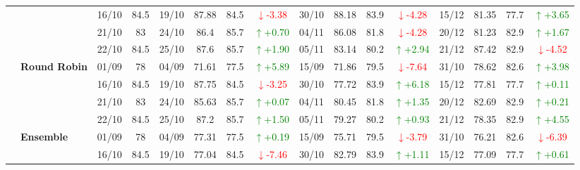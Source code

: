 {\begin{longtable}{llcc|cccc|cccc|cccc}
&
& 16/10 & 84.5 & 19/10 & 87.88 & 84.5 & \textcolor{red}{\(\downarrow\)-3.38} & 30/10 & 88.18 & 83.9 & \textcolor{red}{\(\downarrow\)-4.28} & 15/12 & 81.35 & 77.7 & \textcolor{green}{\(\uparrow\)+3.65} \\

&
& 21/10 & 83 & 24/10 & 86.4 & 85.7 & \textcolor{green}{\(\uparrow\)+0.70} & 04/11 & 86.08 & 81.8 & \textcolor{red}{\(\downarrow\)-4.28} & 20/12 & 81.23 & 82.9 & \textcolor{green}{\(\uparrow\)+1.67} \\

&
& 22/10 & 84.5 & 25/10 & 87.6 & 85.7 & \textcolor{green}{\(\uparrow\)+1.90} & 05/11 & 83.14 & 80.2 & \textcolor{green}{\(\uparrow\)+2.94} & 21/12 & 87.42 & 82.9 & \textcolor{red}{\(\downarrow\)-4.52} \\
\cmidrule(lr){2-16}


& \textbf{Round Robin}
& 01/09 & 78 & 04/09 & 71.61 & 77.5 & \textcolor{green}{\(\uparrow\)+5.89} & 15/09 & 71.86 & 79.5 & \textcolor{red}{\(\downarrow\)-7.64} & 31/10 & 78.62 & 82.6 & \textcolor{green}{\(\uparrow\)+3.98} \\

&
& 16/10 & 84.5 & 19/10 & 87.75 & 84.5 & \textcolor{red}{\(\downarrow\)-3.25} & 30/10 & 77.72 & 83.9 & \textcolor{green}{\(\uparrow\)+6.18} & 15/12 & 77.81 & 77.7 & \textcolor{green}{\(\uparrow\)+0.11} \\

&
& 21/10 & 83 & 24/10 & 85.63 & 85.7 & \textcolor{green}{\(\uparrow\)+0.07} & 04/11 & 80.45 & 81.8 & \textcolor{green}{\(\uparrow\)+1.35} & 20/12 & 82.69 & 82.9 & \textcolor{green}{\(\uparrow\)+0.21} \\

&
& 22/10 & 84.5 & 25/10 & 87.2 & 85.7 & \textcolor{green}{\(\uparrow\)+1.50} & 05/11 & 79.27 & 80.2 & \textcolor{green}{\(\uparrow\)+0.93} & 21/12 & 78.35 & 82.9 & \textcolor{green}{\(\uparrow\)+4.55} \\
\cmidrule(lr){2-16}




& \textbf{Ensemble}
& 01/09 & 78 & 04/09 & 77.31 & 77.5 & \textcolor{green}{\(\uparrow\)+0.19} & 15/09 & 75.71 & 79.5 & \textcolor{red}{\(\downarrow\)-3.79} & 31/10 & 76.21 & 82.6 & \textcolor{red}{\(\downarrow\)-6.39} \\

&
& 16/10 & 84.5 & 19/10 & 77.04 & 84.5 & \textcolor{red}{\(\downarrow\)-7.46} & 30/10 & 82.79 & 83.9 & \textcolor{green}{\(\uparrow\)+1.11} & 15/12 & 77.09 & 77.7 & \textcolor{green}{\(\uparrow\)+0.61} \\


\end{longtable}}

